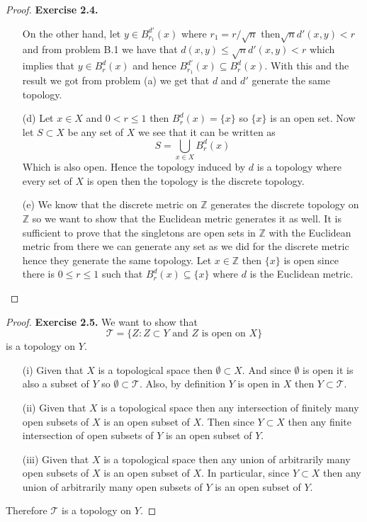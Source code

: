 \documentclass[11pt]{article}
\newcommand{\Z}{\mathbb{Z}}
\newcommand{\Topo}{\mathcal{T}}
\theoremstyle{definition}
\begin{document}
\begin{proof}{\textbf{Exercise 2.4.}}
\begin{itemize}
    On the other hand, let $y \in B_{r_1}^{d'}(x)$ where $r_1 = r/\sqrt{n}$
    then$\sqrt{n}d'(x,y) < r$ and from problem B.1 we have that
    $d(x,y) \leq \sqrt{n} d'(x,y) < r$
    which implies that $y \in B_{r}^{d}(x)$ and hence
    $B_{r_1}^{d'}(x) \subseteq B_{r}^{d}(x)$.
    With this and the result we got from problem (a) we get that $d$ and
    $d'$ generate the same topology.

    \item [(d)] Let $x \in X$ and $0 < r \leq 1$ then $B_r^d(x) = \{x\}$
    so $\{x\}$ is an open set. Now let $S \subset X$ be any set of $X$ we see
    that it can be written as
    $$S = \bigcup_{x \in X} B_r^d(x)$$
    Which is also open. Hence the topology induced by $d$ is a topology where
    every set of $X$ is open then the topology is the discrete topology.

    \item [(e)] We know that the discrete metric on $\Z$ generates the discrete
    topology on $\Z$ so we want to show that the Euclidean metric generates
    it as well. It is sufficient to prove that the singletons are open sets in
    $\Z$ with the Euclidean metric from there we can generate any set as we did
    for the discrete metric hence they generate the same topology.
    Let $x \in \Z$ then $\{x\}$ is open since there is $0\leq r\leq 1$ such
    that $B_r^d(x) \subseteq \{x\}$ where $d$ is the Euclidean metric.
 
\end{itemize}
\end{proof}
\begin{proof}{\textbf{Exercise 2.5.}}
    We want to show that
    $$\Topo = \{Z : Z \subset Y \text{ and $Z$ is open on $X$}\}$$
    is a topology on $Y$.
    \begin{itemize}
    \item [(i)] Given that $X$ is a topological space then $\emptyset \subset X$.
    And since $\emptyset$ is open it is also a subset of $Y$ so
    $\emptyset \subset \Topo$. Also, by definition $Y$ is open in $X$ 
    then $Y \subset \Topo$.
    \item [(ii)] Given that $X$ is a topological space then any intersection
    of finitely many open subsets of $X$ is an open subset of $X$. Then since
    $Y \subset X$ then any finite intersection of open subsets of $Y$ is an open
    subset of $Y$.
    \item [(iii)] Given that $X$ is a topological space then any union of
    arbitrarily many open subsets of $X$ is an open subset of $X$. In
    particular, since $Y \subset X$ then any union of
    arbitrarily many open subsets of $Y$ is an open subset of $Y$.
    \end{itemize}
    Therefore $\Topo$ is a topology on $Y$.
\end{proof}
\end{document}

